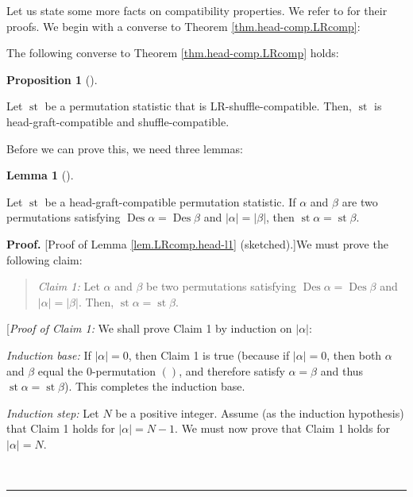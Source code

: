 \documentclass[numbers=enddot,12pt,final,onecolumn,notitlepage]{scrartcl}%
\theoremstyle{definition}
\newtheorem{lem}[theo]{Lemma}
\newenvironment{lemma}[1][]
{\begin{lem}[#1]\begin{leftbar}}
{\end{leftbar}\end{lem}}
\newtheorem{prop}[theo]{Proposition}
\newenvironment{proposition}[1][]
{\begin{prop}[#1]\begin{leftbar}}
{\end{leftbar}\end{prop}}
\newenvironment{statement}{\begin{quote}}{\end{quote}}
\newenvironment{proof}[1][Proof]{\noindent\textbf{#1.} }{\ \rule{0.5em}{0.5em}}
\newenvironment{verlong}{}{}
\newenvironment{vershort}{}{}
\begin{document}
\begin{vershort}
Let us state some more facts on compatibility properties. We refer to
\cite{verlong} for their proofs. We begin with a converse to Theorem
\ref{thm.head-comp.LRcomp}:
\end{vershort}

\begin{verlong}
The following converse to Theorem \ref{thm.head-comp.LRcomp} holds:

\begin{proposition}
\label{prop.LRcomp.head}Let $\operatorname{st}$ be a permutation statistic
that is LR-shuffle-compatible. Then, $\operatorname{st}$ is
head-graft-compatible and shuffle-compatible.
\end{proposition}

Before we can prove this, we need three lemmas:

\begin{lemma}
\label{lem.LRcomp.head-l1}Let $\operatorname{st}$ be a head-graft-compatible
permutation statistic. If $\alpha$ and $\beta$ are two permutations satisfying
$\operatorname{Des}\alpha=\operatorname{Des}\beta$ and $\left\vert
\alpha\right\vert =\left\vert \beta\right\vert $, then
$\operatorname{st} \alpha = \operatorname{st} \beta$.
\end{lemma}

\begin{proof}
[Proof of Lemma \ref{lem.LRcomp.head-l1} (sketched).]We must prove the
following claim:

\begin{statement}
\textit{Claim 1:} Let $\alpha$ and $\beta$ be two permutations satisfying
$\operatorname{Des}\alpha=\operatorname{Des}\beta$ and $\left\vert
\alpha\right\vert =\left\vert \beta\right\vert $. Then,
$\operatorname{st} \alpha = \operatorname{st} \beta$.
\end{statement}

[\textit{Proof of Claim 1:} We shall prove Claim 1 by induction on $\left\vert
\alpha\right\vert $:

\textit{Induction base:} If $\left\vert \alpha\right\vert =0$, then Claim 1 is
true (because if $\left\vert \alpha\right\vert =0$, then both $\alpha$ and
$\beta$ equal the $0$-permutation $\left(  {}\right)  $, and therefore
satisfy $\alpha=\beta$ and thus $\operatorname{st} \alpha
=\operatorname{st} \beta$). This completes the induction base.

\textit{Induction step:} Let $N$ be a positive integer. Assume (as the
induction hypothesis) that Claim 1 holds for $\left\vert \alpha\right\vert
=N-1$. We must now prove that Claim 1 holds for $\left\vert \alpha\right\vert
=N$.


\end{proof}
\end{verlong}
\end{document}
